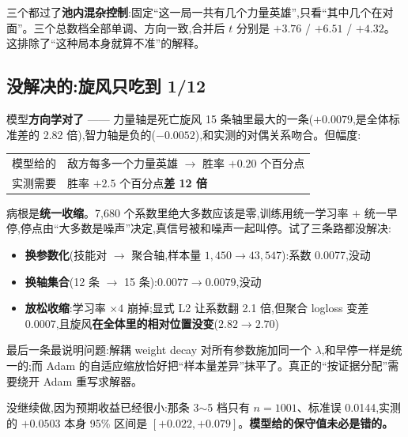 \documentclass[11pt,a4paper]{article}
\begin{document}
三个都过了\textbf{池内混杂控制}:固定“这一局一共有几个力量英雄”,只看“其中几个在对面”。三个总数档全部单调、方向一致,合并后 $t$ 分别是 $+3.76$ / $+6.51$ / $+4.32$。这排除了“这种局本身就算不准”的解释。

\vspace{4pt}
\noindent{}

\subsection{没解决的:旋风只吃到 1/12}
模型\textbf{方向学对了} —— 力量轴是死亡旋风 15 条轴里最大的一条($+0.0079$,是全体标准差的 2.82 倍),智力轴是负的($-0.0052$),和实测的对偶关系吻合。但幅度:
\begin{center}\small
\begin{tabular}{@{}ll@{}}
模型给的 & 敌方每多一个力量英雄 $\to$ 胜率 $+0.20$ 个百分点\\
实测需要 & 胜率 $+2.5$ 个百分点\qquad\textbf{差 12 倍}\\
\end{tabular}
\end{center}

病根是\textbf{统一收缩}。7{,}680 个系数里绝大多数应该是零,训练用统一学习率 $+$ 统一早停,停点由“大多数是噪声”决定,真信号被和噪声一起叫停。试了三条路都没解决:
\begin{itemize}
\item \textbf{换参数化}(技能对 $\to$ 聚合轴,样本量 $1{,}450\to43{,}547$):系数 0.0077,没动
\item \textbf{换轴集合}(12 条 $\to$ 15 条):$0.0077\to0.0079$,没动
\item \textbf{放松收缩}:学习率 $\times4$ 崩掉;显式 L2 让系数翻 2.1 倍,但聚合 logloss 变差 0.0007,且旋风\textbf{在全体里的相对位置没变}($2.82\to2.70$)
\end{itemize}

最后一条最说明问题:解耦 weight decay 对所有参数施加同一个 $\lambda$,和早停一样是统一的;而 Adam 的自适应缩放恰好把“样本量差异”抹平了。真正的“按证据分配”需要绕开 Adam 重写求解器。

没继续做,因为预期收益已经很小:那条 3$\sim$5 档只有 $n=1001$、标准误 0.0144,实测的 $+0.0503$ 本身 95\% 区间是 $[+0.022,+0.079]$。\textbf{模型给的保守值未必是错的。}
\end{document}
